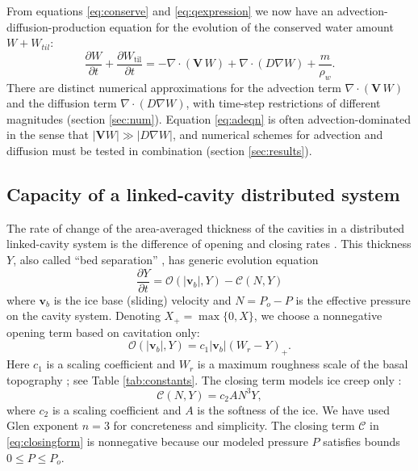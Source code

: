 \documentclass[gmd]{copernicus}   %
\begin{document}
From equations \eqref{eq:conserve} and \eqref{eq:qexpression} we now have an advection-diffusion-production equation for the evolution of the conserved water amount $W+W_{til}$:
\begin{equation} \label{eq:adeqn}
  \frac{\partial W}{\partial t} + \frac{\partial W_{\text{til}}}{\partial t} = - \nabla\cdot\left(\mathbf{V}\, W\right) + \nabla\cdot \left(D \nabla W\right) + \frac{m}{\rho_w}.
\end{equation}
There are distinct numerical approximations for the advection term $\nabla\cdot\left(\mathbf{V}\, W\right)$ and the diffusion term $\nabla\cdot \left(D \nabla W\right)$, with time-step restrictions of different magnitudes (section \ref{sec:num}).  Equation \eqref{eq:adeqn} is often advection-dominated in the sense that $|\mathbf{V} W| \gg |D \nabla W|$, and numerical schemes for advection and diffusion must be tested in combination (section \ref{sec:results}).

\subsection{Capacity of a linked-cavity distributed system}  \label{subsec:cavities}  The rate of change of the area-averaged thickness of the cavities in a distributed linked-cavity system is the difference of opening and closing rates \citep{Hewitt2011}.  This thickness $Y$, also called ``bed separation'' \citep{Bartholomausetal2011}, has generic evolution equation
\begin{equation}
\frac{\partial Y}{\partial t} = \mathcal{O}(|\mathbf{v}_b|,Y) - \mathcal{C}(N,Y) \label{eq:hewittcapacity}
\end{equation}
where $\mathbf{v}_b$ is the ice base (sliding) velocity and $N=P_o-P$ is the effective pressure on the cavity system.  Denoting $X_+= \max\{0,X\}$, we choose a nonnegative opening term based on cavitation only:
\begin{equation}
\mathcal{O}(|\mathbf{v}_b|,Y) = c_1 |\mathbf{v}_b| (W_r - Y)_+. \label{eq:openingform}
\end{equation}
Here $c_1$ is a scaling coefficient and $W_r$ is a maximum roughness scale of the basal topography \citep{Schoofetal2012}; see Table \ref{tab:constants}.  The closing term models ice creep only \citep{Hewitt2011,Schoofetal2012}:
\begin{equation}
\mathcal{C}(N,Y) = c_2 A N^3 Y, \label{eq:closingform}
\end{equation}
where $c_2$ is a scaling coefficient and $A$ is the softness of the ice.  We have used Glen exponent $n=3$ for concreteness and simplicity.  The closing term $\mathcal{C}$ in \eqref{eq:closingform} is nonnegative because our modeled pressure $P$ satisfies bounds $0\le P \le P_o$.
\end{document}
